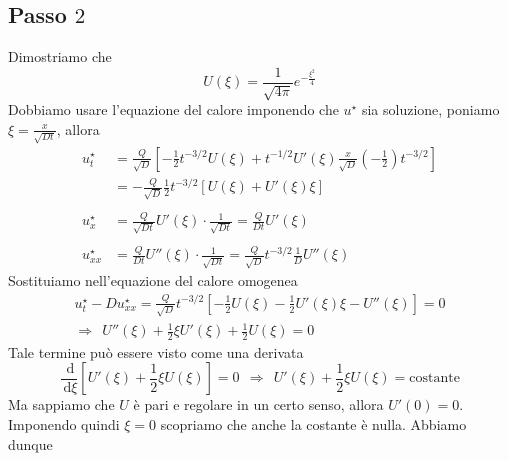 \documentclass[10pt,a4paper,twoside,openright]{book}
\newcommand{\de}{\,\mathrm d}
\newcommand{\dxi}{\de \xi}
\begin{document}
\subsection{Passo \texorpdfstring{$2$}{2}}

Dimostriamo che
\begin{equation*}
    U(\xi) =\frac{1}{\sqrt{4\pi }} e^{-\frac{\xi ^{2}}{4}}
\end{equation*}
Dobbiamo usare l'equazione del calore imponendo che $u^{\star }$ sia soluzione, poniamo $\xi =\frac{x}{\sqrt{Dt}}$, allora
\begin{align*}
    u^{\star }_{t}  & =\frac{Q}{\sqrt{D}}\left[ -\frac{1}{2} t^{-3/2} U(\xi) +t^{-1/2} U'(\xi)\frac{x}{\sqrt{D}}\left(-\frac{1}{2}\right) t^{-3/2}\right] \\
                    & =-\frac{Q}{\sqrt{D}}\frac{1}{2} t^{-3/2}[ U(\xi) +U'(\xi) \xi ]                                                                     \\
                    &                                                                                                                                     \\
    u^{\star }_{x}  & =\frac{Q}{\sqrt{Dt}} U'(\xi) \cdotp \frac{1}{\sqrt{Dt}} =\frac{Q}{Dt} U'(\xi)                                                       \\
                    &                                                                                                                                     \\
    u^{\star }_{xx} & =\frac{Q}{Dt} U''(\xi) \cdotp \frac{1}{\sqrt{Dt}} =\frac{Q}{\sqrt{D}} t^{-3/2}\frac{1}{D} U''(\xi)
\end{align*}
Sostituiamo nell'equazione del calore omogenea
\begin{gather*}
    u^{\star }_{t} -Du^{\star }_{xx} =\frac{Q}{\sqrt{D}} t^{-3/2}\left[ -\frac{1}{2} U(\xi) -\frac{1}{2} U'(\xi) \xi -U''(\xi)\right] =0\\
    \Rightarrow \ \ U''(\xi) +\frac{1}{2} \xi U'(\xi) +\frac{1}{2} U(\xi) =0
\end{gather*}
Tale termine può essere visto come una derivata
\begin{equation*}
    \frac{\de}{\dxi }\left[ U'(\xi) +\frac{1}{2} \xi U(\xi)\right] =0\ \ \Rightarrow \ \ U'(\xi) +\frac{1}{2} \xi U(\xi) =\text{costante}
\end{equation*}
Ma sappiamo che $U$ è pari e regolare in un certo senso, allora $U'(0) =0$. Imponendo quindi $\xi =0$ scopriamo che anche la costante è nulla. Abbiamo dunque
\end{document}
